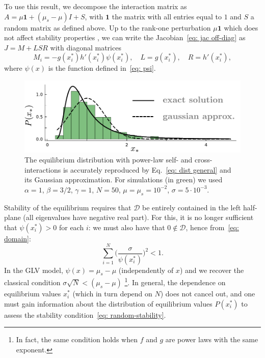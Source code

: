 To use this result, we decompose the interaction matrix as $A = \mu\mathbf{1} + (\mu_s-\mu)I + S$,
with $\mathbf{1}$ the matrix with all entries equal to $1$ and $S$ a random matrix as defined above.
Up to the rank-one perturbation $\mu\mathbf{1}$ which does not affect stability properties \cite{Stone2018}, we can write the Jacobian~\eqref{eq: jac off-diag} as $J = M + LSR$ with diagonal matrices
\begin{equation}
    M_i = - g(x_i^*)h'(x_i^*)\psi(x_i^*),\quad L = g(x_i^*), \quad R = h'(x_i^*),
\end{equation}
where $\psi(x)$ is the function defined in~\eqref{eq: psi}. 
\begin{figure}[t!]
    \includegraphics[width=.45\textwidth]{figs/cavity.pdf}
    \caption{The equilibrium distribution with power-law self- and cross-interactions is accurately reproduced by 
    Eq.~\eqref{eq: dist general} and its Gaussian approximation.
    For simulations (in green) we used $\alpha=1$, $\beta=3/2$,
    $\gamma=1$, $N=50$, $\mu=\mu_s=10^{-2}$, $\sigma=5\cdot 10^{-3}$.}
    \label{fig: cavity sol.}
\end{figure}
Stability of the equilibrium requires that $\mathcal{D}$ be entirely contained in the left half-plane (all eigenvalues have negative real part). For this, it is no longer sufficient that $\psi(x_i^*) > 0$ for each $i$: we must also have that $0\notin \mathcal{D}$, hence from~\eqref{eq: domain}:
\begin{equation}
    \sum_{i=1}^N \Big(\frac{\sigma}{\psi(x_i^*)}\Big)^{2}
    < 1.
    \label{eq: random-stability}
\end{equation}
In the GLV model, $\psi(x) = \mu_s - \mu$ (independently of $x$) and we recover the classical condition $\sigma\sqrt{N} < (\mu_s-\mu)$ \footnote{In fact, the same condition holds when $f$ and $g$ are power laws with the same exponent.}. In general, the dependence on equilibrium values $x_i^*$ (which in turn depend on $N$) does not cancel out, and one must gain information about the distribution of equilibrium values $P(x_i^*)$ to assess the stability condition~\eqref{eq: random-stability}.